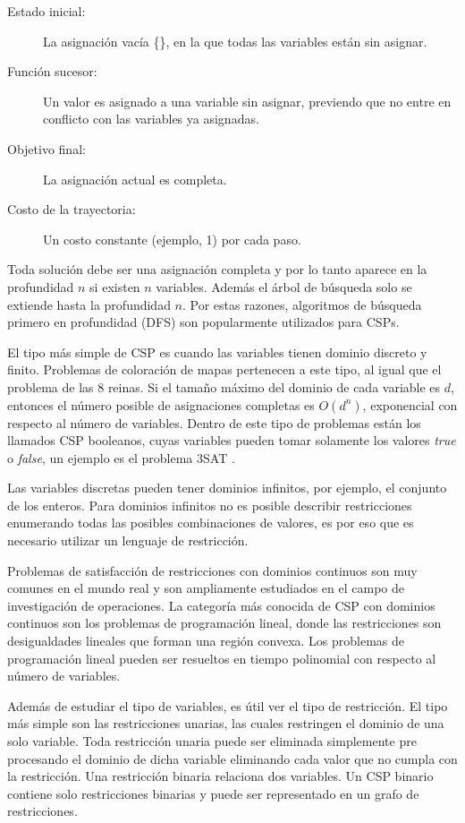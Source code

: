 \begin{description}
	\item[Estado inicial:] La asignaci\'on vac\'ia \{\}, en la que todas las variables est\'an sin asignar.
	\item[Funci\'on sucesor:] Un valor es asignado a una variable sin asignar, previendo que no entre en conflicto con las variables ya asignadas.
	\item[Objetivo final:] La asignaci\'on actual es completa.
	\item[Costo de la trayectoria:] Un costo constante (ejemplo, 1) por cada paso.
\end{description}

Toda soluci\'on debe ser una asignaci\'on completa y por lo tanto aparece en la profundidad $n$ si existen $n$ variables. Adem\'as el \'arbol de búsqueda solo se extiende hasta la profundidad $n$. Por estas razones, algoritmos de b\'usqueda primero en profundidad (DFS) son popularmente utilizados para CSPs.

El tipo m\'as simple de CSP es cuando las variables tienen dominio discreto y finito. Problemas de coloraci\'on de mapas pertenecen a este tipo, al igual que el problema de las 8 reinas. Si el tamaño m\'aximo del dominio de cada variable es $d$, entonces el n\'umero posible de asignaciones completas es $O(d^{n})$, exponencial con respecto al n\'umero de variables. Dentro de este tipo de problemas est\'an los llamados CSP booleanos, cuyas variables pueden tomar solamente los valores \emph{true} o \emph{false}, un ejemplo es el problema 3SAT \cite{Carla P. Gomes}.

Las variables discretas pueden tener dominios infinitos, por ejemplo, el conjunto de los enteros. Para dominios infinitos no es posible describir restricciones enumerando todas las posibles combinaciones de valores, es por eso que es necesario utilizar un lenguaje de restricci\'on. 

Problemas de satisfacci\'on de restricciones con dominios continuos son muy comunes en el mundo real y son ampliamente estudiados en el campo de investigaci\'on de operaciones. La categor\'ia m\'as conocida de CSP con dominios continuos son los problemas de programaci\'on lineal, donde las restricciones son desigualdades lineales que forman una regi\'on convexa. Los problemas de programaci\'on lineal pueden ser resueltos en tiempo polinomial con respecto al n\'umero de variables.

Adem\'as de estudiar el tipo de variables, es \'util ver el tipo de restricci\'on. El tipo m\'as simple son las restricciones unarias, las cuales restringen el dominio de una solo variable. Toda restricci\'on unaria puede ser eliminada simplemente pre procesando el dominio de dicha variable eliminando cada valor que no cumpla con la restricci\'on. Una restricci\'on binaria relaciona dos variables. Un CSP binario contiene solo restricciones binarias y puede ser representado en un grafo de restricciones.

